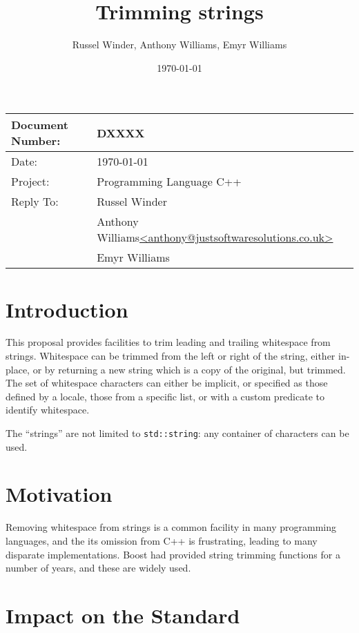\documentclass[10pt,a4paper,article]{memoir}
\title{Trimming strings}
\author{Russel Winder, Anthony Williams, Emyr Williams}
\date{\today}
\begin{document}
\maketitle

\begin{tabularx}{\textwidth}{|l|X|}
  \hline 
  Document Number: &  DXXXX\\
  \hline
Date: & \today \\
\hline
Project: & Programming Language C++\\
\hline
  Reply To: & Russel Winder\\
  & Anthony Williams\hfill \href{mailto:anthony@justsoftwaresolutions.co.uk}{<anthony@justsoftwaresolutions.co.uk>}\\
  & Emyr Williams\\
\hline
\end{tabularx}

\tableofcontents

\chapter{Introduction}
\label{sec:introduction}

This proposal provides facilities to trim leading and trailing whitespace from
strings. Whitespace can be trimmed from the left or right of the string, either
in-place, or by returning a new string which is a copy of the original, but
trimmed. The set of whitespace characters can either be implicit, or specified
as those defined by a locale, those from a specific list, or with a custom
predicate to identify whitespace.

The ``strings'' are not limited to \texttt{std::string}: any container of
characters can be used.

\chapter{Motivation}
\label{sec:motivation}

Removing whitespace from strings is a common facility in many programming
languages, and the its omission from C++ is frustrating, leading to many
disparate implementations. Boost had provided string trimming functions for a
number of years, and these are widely used.

\chapter{Impact on the Standard}
\label{sec:impact}
\end{document}

